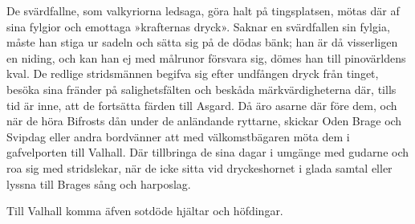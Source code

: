 De svärdfallne, som valkyriorna ledsaga, göra halt på tingsplatsen,
mötas där af sina fylgior och emottaga
»krafternas\protect\hypertarget{lb1625905.xhtmlux5cux23start186}{}{}\protect\hypertarget{lb1625905.xhtmlux5cux23start186-a}{}{}\protect\hypertarget{lb1625905.xhtmlux5cux23start186-b}{}{}\protect\hypertarget{lb1625905.xhtmlux5cux23start186-c}{}{}\protect\hypertarget{lb1625905.xhtmlux5cux23start186-d}{}{}
dryck». Saknar en svärdfallen sin fylgia, måste han stiga ur sadeln och
sätta sig på de dödas bänk; han är då visserligen en niding, och kan han
ej med målrunor försvara sig, dömes han till pinovärldens kval. De
redlige stridsmännen begifva sig efter undfången dryck från tinget,
besöka sina fränder på salighetsfälten och beskåda märkvärdigheterna
där, tills tid är inne, att de fortsätta färden till Asgard. Då äro
asarne där före dem, och när de höra Bifrosts dån under de anländande
ryttarne, skickar Oden Brage och Svipdag eller andra bordvänner att med
välkomstbägaren möta dem i gafvelporten till Valhall. Där tillbringa de
sina dagar i umgänge med gudarne och roa sig med stridslekar, när de
icke sitta vid dryckeshornet i glada samtal eller lyssna till Brages
sång och harposlag.

Till Valhall komma äfven sotdöde hjältar och höfdingar.

